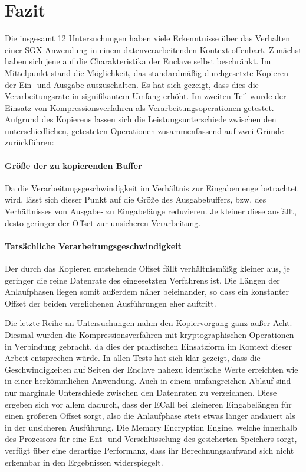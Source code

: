 \section{Fazit}

Die insgesamt 12 Untersuchungen haben viele Erkenntnisse über das Verhalten einer \ac{SGX} Anwendung in einem datenverarbeitenden Kontext offenbart. Zunächst haben sich jene auf die Charakteristika der Enclave selbst beschränkt. Im Mittelpunkt stand die Möglichkeit, das standardmäßig durchgesetzte Kopieren der Ein- und Ausgabe auszuschalten. Es hat sich gezeigt, dass dies die Verarbeitungsrate in signifikantem Umfang erhöht. Im zweiten Teil wurde der Einsatz von Kompressionsverfahren als Verarbeitungsoperationen getestet. Aufgrund des Kopierens lassen sich die Leistungsunterschiede zwischen den unterschiedlichen, getesteten Operationen zusammenfassend auf zwei Gründe zurückführen:

\paragraph{Größe der zu kopierenden Buffer}
Da die Verarbeitungsgeschwindigkeit im Verhältnis zur Eingabemenge betrachtet wird, lässt sich dieser Punkt auf die Größe des Ausgabebuffers, bzw. des Verhältnisses von Ausgabe- zu Eingabelänge reduzieren. Je kleiner diese ausfällt, desto geringer der Offset zur unsicheren Verarbeitung.

\paragraph{Tatsächliche Verarbeitungsgeschwindigkeit}
Der durch das Kopieren entstehende Offset fällt verhältnismäßig kleiner aus, je geringer die reine Datenrate des eingesetzten Verfahrens ist. Die Längen der Anlaufphasen liegen somit außerdem näher beieinander, so dass ein konstanter Offset der beiden verglichenen Ausführungen eher auftritt.

Die letzte Reihe an Untersuchungen nahm den Kopiervorgang ganz außer Acht. Diesmal wurden die Kompressionsverfahren mit kryptographischen Operationen in Verbindung gebracht, da dies der praktischen Einsatzform im Kontext dieser Arbeit entsprechen würde. In allen Tests hat sich klar gezeigt, dass die Geschwindigkeiten auf Seiten der Enclave nahezu identische Werte erreichten wie in einer herkömmlichen Anwendung. Auch in einem umfangreichen Ablauf sind nur marginale Unterschiede zwischen den Datenraten zu verzeichnen. Diese ergeben sich vor allem dadurch, dass der \ac{ECall} bei kleineren Eingabelängen für einen größeren Offset sorgt, also die Anlaufphase stets etwas länger andauert als in der unsicheren Ausführung. Die Memory Encryption Engine, welche innerhalb des Prozessors für eine Ent- und Verschlüsselung des gesicherten Speichers sorgt, verfügt über eine derartige Performanz, dass ihr Berechnungsaufwand sich nicht erkennbar in den Ergebnissen widerspiegelt.


